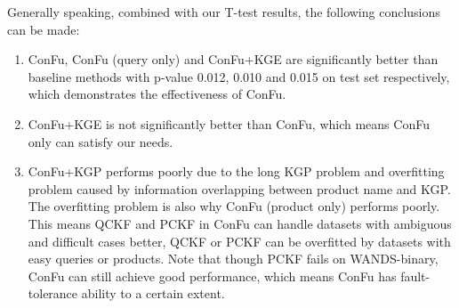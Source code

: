 Generally speaking, combined with our T-test results, the following conclusions can be made:

\begin{enumerate}
  \item ConFu, ConFu (query only) and ConFu+KGE are significantly better than baseline methods with p-value 0.012, 0.010 and 0.015 on test set respectively, which demonstrates the effectiveness of ConFu.
  \item ConFu+KGE is not significantly better than ConFu, which means ConFu only can satisfy our needs.
  \item ConFu+KGP performs poorly due to the long KGP problem and overfitting problem caused by information overlapping between product name and KGP. The overfitting problem is also why ConFu (product only) performs poorly. This means QCKF and PCKF in ConFu can handle datasets with ambiguous and difficult cases better, QCKF or PCKF can be overfitted by datasets with easy queries or products. Note that though PCKF fails on WANDS-binary, ConFu can still achieve good performance, which means ConFu has fault-tolerance ability to a certain extent.
\end{enumerate}





